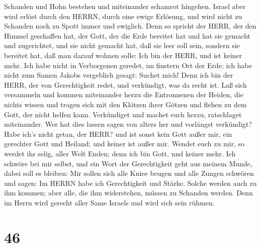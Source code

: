 Schanden und Hohn bestehen und miteinander schamrot hingehen.
 Israel aber wird erlöst durch den HERRN, durch eine ewige
Erlösung, und wird nicht zu Schanden noch zu Spott immer und ewiglich.
 Denn so spricht der HERR, der den Himmel geschaffen hat,
der Gott, der die Erde bereitet hat und hat sie gemacht und zugerichtet,
und sie nicht gemacht hat, daß sie leer soll sein, sondern sie bereitet
hat, daß man darauf wohnen solle: Ich bin der HERR, und ist keiner mehr.
 Ich habe nicht in Verborgenen geredet, im finstern Ort der
Erde; ich habe nicht zum Samen Jakobs vergeblich gesagt: Suchet mich!
Denn ich bin der HERR, der von Gerechtigkeit redet, und verkündigt, was
da recht ist.  Laß sich versammeln und kommen miteinander
herzu die Entronnenen der Heiden, die nichts wissen und tragen sich mit
den Klötzen ihrer Götzen und flehen zu dem Gott, der nicht helfen kann.
 Verkündiget und machet euch herzu, ratschlaget
miteinander. Wer hat dies lassen sagen von alters her und vorlängst
verkündigt? Habe ich's nicht getan, der HERR? und ist sonst kein Gott
außer mir, ein gerechter Gott und Heiland; und keiner ist außer mir.
 Wendet euch zu mir, so werdet ihr selig, aller Welt Enden;
denn ich bin Gott, und keiner mehr.  Ich schwöre bei mir
selbst, und ein Wort der Gerechtigkeit geht aus meinem Munde, dabei soll
es bleiben: Mir sollen sich alle Kniee beugen und alle Zungen schwören
 und sagen: Im HERRN habe ich Gerechtigkeit und Stärke.
Solche werden auch zu ihm kommen; aber alle, die ihm widerstehen, müssen
zu Schanden werden.  Denn im Herrn wird gerecht aller Same
Israels und wird sich sein rühmen.

\hypertarget{section-45}{%
\section{46}\label{section-45}}

